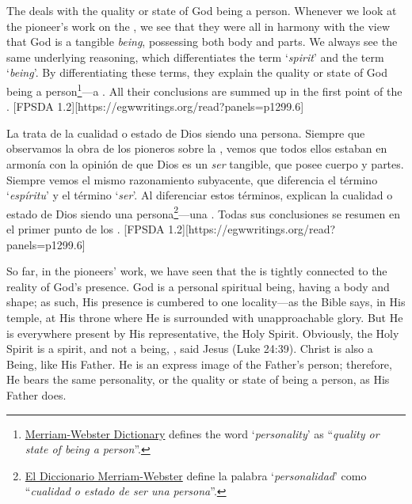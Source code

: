 



The  deals with the quality or state of God being a person. Whenever we look at the pioneer's work on the , we see that they were all in harmony with the view that God is a tangible \textit{being}, possessing both body and parts. We always see the same underlying reasoning, which differentiates the term ‘\textit{spirit}’ and the term ‘\textit{being}’. By differentiating these terms, they explain the quality or state of God being a person\footnote{\href{https://www.merriam-webster.com/dictionary/personality}{Merriam-Webster Dictionary} defines the word ‘\textit{personality}’ as “\textit{quality or state of being a person}”.}—a . All their conclusions are summed up in the first point of the . [FPSDA 1.2][https://egwwritings.org/read?panels=p1299.6]


La  trata de la cualidad o estado de Dios siendo una persona. Siempre que observamos la obra de los pioneros sobre la , vemos que todos ellos estaban en armonía con la opinión de que Dios es un \textit{ser} tangible, que posee cuerpo y partes. Siempre vemos el mismo razonamiento subyacente, que diferencia el término ‘\textit{espíritu}’ y el término ‘\textit{ser}’. Al diferenciar estos términos, explican la cualidad o estado de Dios siendo una persona\footnote{\href{https://www.merriam-webster.com/dictionary/personality}{El Diccionario Merriam-Webster} define la palabra ‘\textit{personalidad}’ como “\textit{cualidad o estado de ser una persona}”.}—una . Todas sus conclusiones se resumen en el primer punto de los . [FPSDA 1.2][https://egwwritings.org/read?panels=p1299.6]


So far, in the pioneers’ work, we have seen that the  is tightly connected to the reality of God’s presence. God is a personal spiritual being, having a body and shape; as such, His presence is cumbered to one locality—as the Bible says, in His temple, at His throne where He is surrounded with unapproachable glory. But He is everywhere present by His representative, the Holy Spirit. Obviously, the Holy Spirit is a spirit, and not a being, , said Jesus (Luke 24:39). Christ is also a Being, like His Father. He is an express image of the Father’s person; therefore, He bears the same personality, or the quality or state of being a person, as His Father does.


